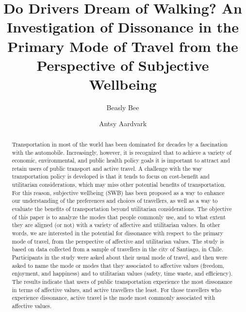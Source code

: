 \documentclass[]{elsarticle} %
\begin{document}
\begin{frontmatter}

  \title{Do Drivers Dream of Walking? An Investigation of Dissonance in the
Primary Mode of Travel from the Perspective of Subjective Wellbeing}
    \author[Some University]{Beasly Bee}
    \author[Some School]{Antsy Aardvark}
  
      \address[Some University]{Department, Street, City, State, Zip}
    \address[Some School]{Department, Street, City, State, Zip}
  
  \begin{abstract}
  Transportation in most of the world has been dominated for decades by a
  fascination with the automobile. Increasingly, however, it is recognized
  that to achieve a variety of economic, environmental, and public health
  policy goals it is important to attract and retain users of public
  transport and active travel. A challenge with the way transportation
  policy is developed is that it tends to focus on cost-benefit and
  utilitarian considerations, which may miss other potential benefits of
  transportation. For this reason, subjective wellbeing (SWB) has been
  proposed as a way to enhance our understanding of the preferences and
  choices of travellers, as well as a way to evaluate the benefits of
  transportation beyond utilitarian considerations. The objective of this
  paper is to analyze the modes that people commonly use, and to what
  extent they are aligned (or not) with a variety of affective and
  utilitarian values. In other words, we are interested in the potential
  for dissonance with respect to the primary mode of travel, from the
  perspective of affective and utilitarian values. The study is based on
  data collected from a sample of travellers in the city of Santiago, in
  Chile. Participants in the study were asked about their usual mode of
  travel, and then were asked to name the mode or modes that they
  associated to affective values (freedom, enjoyment, and happiness) and
  to utilitarian values (safety, time waste, and efficiency). The results
  indicate that users of public transportation experience the most
  dissonance in terms of affective values, and active travellers the
  least. For those travellers who experience dissonance, active travel is
  the mode most commonly associated with affective values.
  

\end{abstract}
\end{frontmatter}
\end{document}
